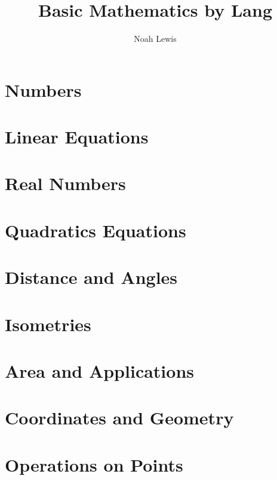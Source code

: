 \documentclass[10pt]{article}  %
\title{Basic Mathematics by Lang}
\author{Noah Lewis}
\begin{document}
\maketitle

\tableofcontents

\section{Numbers}

\section{Linear Equations}

\section{Real Numbers}

\section{Quadratics Equations}

\section{Distance and Angles}

\section{Isometries}

\section{Area and Applications}

\section{Coordinates and Geometry}

\section{Operations on Points}

\end{document}
